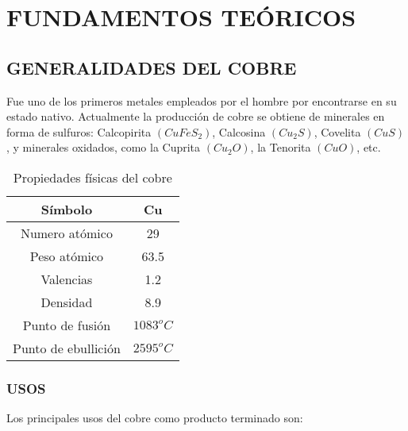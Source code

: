 \chapter{FUNDAMENTOS TE\'ORICOS}
\section{GENERALIDADES DEL COBRE}

Fue uno de los primeros metales empleados por el hombre por encontrarse en su estado nativo. Actualmente la producci\'on de cobre se obtiene de minerales en forma de sulfuros: Calcopirita $(CuFeS_2)$, Calcosina $(Cu_2S)$, Covelita $(CuS)$, y minerales oxidados, como la Cuprita $(Cu_2O)$, la Tenorita $(CuO)$, etc.

\begin{table}[H]
\label{tabla1}
\begin{center}
\begin{tabular}{|c|c|}
\hline
S\'imbolo&Cu\\
\hline
Numero at\'omico&29\\
Peso at\'omico&63.5\\
Valencias&1.2\\
Densidad	&8.9\\
Punto de fusi\'on&$1083^oC$\\
Punto de ebullici\'on&$2595^oC$\\
\hline
\end{tabular}
\end{center}
\caption{Propiedades f\'isicas del cobre}
\end{table}


\subsection{USOS}

Los principales usos del cobre como producto terminado son:\\

